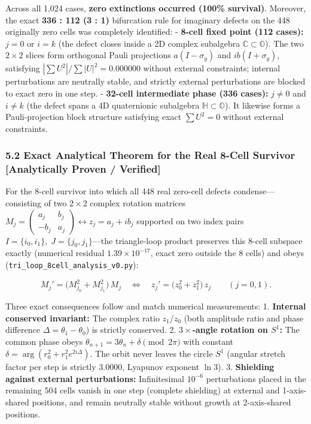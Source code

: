 \documentclass[
  a4paper,
]{article}
\begin{document}
Across all 1,024 cases, \textbf{zero extinctions occurred (100\%
survival)}. Moreover, the exact \textbf{336 : 112 (3 : 1)} bifurcation
rule for imaginary defects on the 448 originally zero cells was
completely identified: - \textbf{8-cell fixed point (112 cases):}
\(j = 0\) or \(i = k\) (the defect closes inside a 2D complex subalgebra
\(\mathbb{C} \subset \mathbb{O}\)). The two \(2 \times 2\) slices form
orthogonal Pauli projections \(a(I - \sigma_y)\) and
\(ib(I + \sigma_y)\), satisfying \(|\sum U^2| / \sum |U|^2 = 0.000000\)
without external constraints; internal perturbations are neutrally
stable, and strictly external perturbations are blocked to exact zero in
one step. - \textbf{32-cell intermediate phase (336 cases):}
\(j \neq 0\) and \(i \neq k\) (the defect spans a 4D quaternionic
subalgebra \(\mathbb{H} \subset \mathbb{O}\)). It likewise forms a
Pauli-projection block structure satisfying exact \(\sum U^2 = 0\)
without external constraints.

\subsubsection{5.2 Exact Analytical Theorem for the Real 8-Cell Survivor
{[}Analytically Proven /
Verified{]}}\label{exact-analytical-theorem-for-the-real-8-cell-survivor-analytically-proven-verified}

For the 8-cell survivor into which all 448 real zero-cell defects
condense---consisting of two \(2 \times 2\) complex rotation matrices
\(M_j = \begin{pmatrix} a_j & b_j \\ -b_j & a_j \end{pmatrix} \leftrightarrow z_j = a_j + i b_j\)
supported on two index pairs
\(I = \{i_0, i_1\},\; J = \{j_0, j_1\}\)---the triangle-loop product
preserves this 8-cell subspace exactly (numerical residual
\(1.39 \times 10^{-17}\), exact zero outside the 8 cells) and obeys
(\texttt{tri\_\allowbreak{}loop\_\allowbreak{}8cell\_\allowbreak{}analysis\_\allowbreak{}v0.py}):

\[M_j' = \bigl(M_{j_0}^2 + M_{j_1}^2\bigr)\, M_j \quad \Longleftrightarrow \quad z_j' = \bigl(z_0^2 + z_1^2\bigr)\, z_j \qquad (j = 0, 1). \tag{3}\]

Three exact consequences follow and match numerical measurements: 1.
\textbf{Internal conserved invariant:} The complex ratio \(z_1 / z_0\)
(both amplitude ratio and phase difference
\(\Delta = \theta_1 - \theta_0\)) is strictly conserved. 2.
\textbf{\(3\times\)-angle rotation on \(S^1\):} The common phase obeys
\(\theta_{n+1} = 3\theta_n + \delta \pmod{2\pi}\) with constant
\(\delta = \arg(r_0^2 + r_1^2 e^{2i\Delta})\). The orbit never leaves
the circle \(S^1\) (angular stretch factor per step is strictly
\(3.0000\), Lyapunov exponent \(\ln 3\)). 3. \textbf{Shielding against
external perturbations:} Infinitesimal \(10^{-6}\) perturbations placed
in the remaining 504 cells vanish in one step (complete shielding) at
external and 1-axis-shared positions, and remain neutrally stable
without growth at 2-axis-shared positions.
\end{document}
